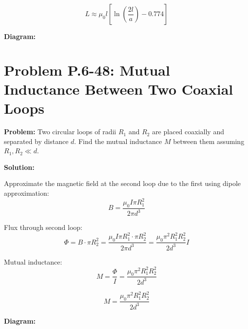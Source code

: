 \documentclass[12pt]{article}
\begin{document}
\begin{tcolorbox}
\[
\boxed{L \approx \mu_0 l \left[ \ln\left( \frac{2l}{a} \right) - 0.774 \right]}
\]
\end{tcolorbox}

\textbf{Diagram:}
\begin{center}
\end{center}



\section*{Problem P.6-48: Mutual Inductance Between Two Coaxial Loops}

\textbf{Problem:}  
Two circular loops of radii \( R_1 \) and \( R_2 \) are placed coaxially and separated by distance \( d \). Find the mutual inductance \( M \) between them assuming \( R_1, R_2 \ll d \).

\textbf{Solution:}

Approximate the magnetic field at the second loop due to the first using dipole approximation:
\[
B = \frac{\mu_0 I \pi R_1^2}{2\pi d^3}
\]

Flux through second loop:
\[
\Phi = B \cdot \pi R_2^2 = \frac{\mu_0 I \pi R_1^2 \cdot \pi R_2^2}{2\pi d^3}
= \frac{\mu_0 \pi^2 R_1^2 R_2^2}{2 d^3} I
\]

Mutual inductance:
\[
M = \frac{\Phi}{I} = \frac{\mu_0 \pi^2 R_1^2 R_2^2}{2 d^3}
\]

\begin{tcolorbox}
\[
\boxed{M = \frac{\mu_0 \pi^2 R_1^2 R_2^2}{2 d^3}}
\]
\end{tcolorbox}

\textbf{Diagram:}
\begin{center}
\end{center}
\end{document}
